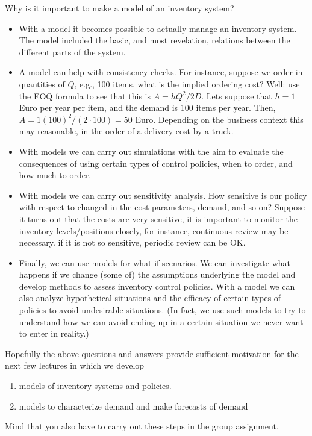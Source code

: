 \begin{question}
  Why is it important to make a model of an inventory system?
  \begin{solution}
    \begin{itemize}
    \item With a model it becomes possible to actually manage an
      inventory system. The model included the basic, and most
      revelation, relations between the different parts of the system.
    \item A model can help with consistency checks. For instance,
      suppose we order in quantities of $Q$, e.g., 100 items, what is
      the implied ordering cost?  Well: use the EOQ formula to see
      that this is $A=hQ^2/2D$.  Lets suppose that $h=1$ Euro per year
      per item, and the demand is 100 items per year. Then,
      $A=1(100)^2/(2\cdot 100) = 50$ Euro. Depending on the business
      context this may reasonable, in the order of a delivery cost by
      a truck.
    \item With models we can carry out simulations with the aim to
      evaluate the consequences of using certain types of control
      policies, when to order, and how much to order.
    \item With models we can carry out sensitivity analysis. How
      sensitive is our policy with respect to changed in the cost
      parameters, demand, and so on? Suppose it turns out that the
      costs are very sensitive, it is important to monitor the
      inventory levels/positions closely, for instance, continuous
      review may be necessary. if it is not so sensitive, periodic
      review can be OK.
    \item Finally, we can use models for what if scenarios.  We can
      investigate what happens if we change (some of) the assumptions
      underlying the model and develop methods to assess inventory
      control policies. With a model we can also analyze hypothetical
      situations and the efficacy of certain types of policies to
      avoid undesirable situations. (In fact, we use such models to
      try to understand how we can avoid ending up in a certain
      situation we never want to enter in reality.)
    \end{itemize}
  \end{solution}
\end{question}

Hopefully the above questions and answers provide sufficient
motivation for the next few lectures in which we develop
\begin{enumerate}
 \item models of inventory systems  and policies. 
 \item models to characterize demand and make forecasts of demand
\end{enumerate}
Mind that you also have to carry out these steps in the group
assignment.


